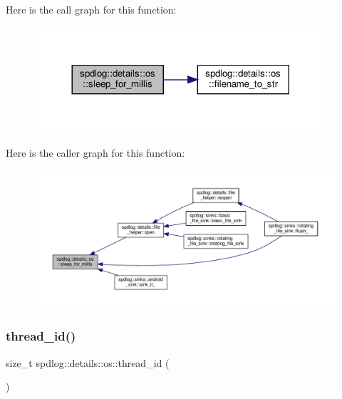 Here is the call graph for this function\+:
\nopagebreak
\begin{figure}[H]
\begin{center}
\leavevmode
\includegraphics[width=308pt]{namespacespdlog_1_1details_1_1os_a49ccbc872aa679db9d1187a48897804e_cgraph}
\end{center}
\end{figure}
Here is the caller graph for this function\+:
\nopagebreak
\begin{figure}[H]
\begin{center}
\leavevmode
\includegraphics[width=350pt]{namespacespdlog_1_1details_1_1os_a49ccbc872aa679db9d1187a48897804e_icgraph}
\end{center}
\end{figure}
\mbox{\label{namespacespdlog_1_1details_1_1os_ad0fc3a9bd510324d2d5f31acb3607e90}} 
\subsubsection{\texorpdfstring{thread\+\_\+id()}{thread\_id()}}
{\footnotesize\ttfamily size\+\_\+t spdlog\+::details\+::os\+::thread\+\_\+id (\begin{DoxyParamCaption}{ }\end{DoxyParamCaption})\hspace{0.3cm}{\ttfamily [inline]}}



